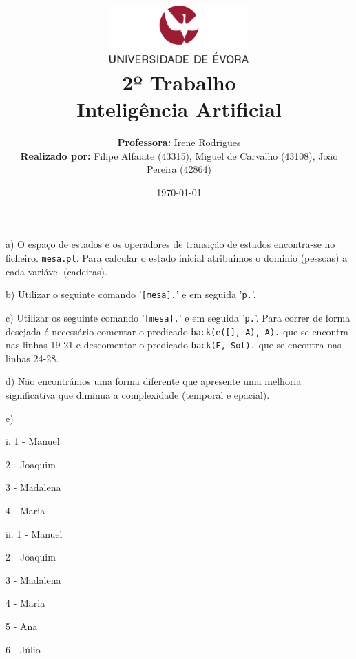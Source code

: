\documentclass[11pt]{article}
\title
{
    \includegraphics[width=0.4\textwidth]{imgs/university.png}
    \\[0.1cm]
    \textbf{2º Trabalho} \\
    Inteligência Artificial
}
\author
{
    \textbf{Professora:} Irene Rodrigues \\
    \textbf{Realizado por:} Filipe Alfaiate (43315), Miguel de Carvalho (43108), João Pereira (42864) 
}
\date{\today}
\begin{document}
\maketitle

\section{}

\hspace{0,6cm}a) O espaço de estados e os operadores de transição de estados encontra-se no ficheiro.
\verb|mesa.pl|. Para calcular o estado inicial atribuimos o dominio (pessoas) a cada variável (cadeiras).

b) Utilizar o seguinte comando '\verb|[mesa].|' e em seguida '\verb|p.|'.

c) Utilizar os seguinte comando '\verb|[mesa].|' e em seguida '\verb|p.|'. Para correr de forma desejada 
é necessário comentar o predicado \verb|back(e([], A), A).| que se encontra nas linhas 19-21 e descomentar
o predicado \verb|back(E, Sol).| que se encontra nas linhas 24-28.

d) Não encontrámos uma forma diferente que apresente uma melhoria significativa que diminua a complexidade
(temporal e epacial).

e)

\hspace{0,7cm}i. 1 - Manuel

\hspace{1,1cm}2 - Joaquim

\hspace{1,1cm}3 - Madalena

\hspace{1,1cm}4 - Maria
\newline

\hspace{0,6cm}ii. 1 - Manuel

\hspace{1,1cm}2 - Joaquim

\hspace{1,1cm}3 - Madalena

\hspace{1,1cm}4 - Maria

\hspace{1,1cm}5 - Ana

\hspace{1,1cm}6 - Júlio
\newline
\end{document}
